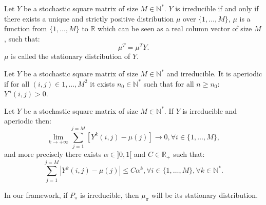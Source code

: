 \documentclass{llncs}
\newcommand{\0}{\mathbf{0}}
\newcommand{\1}{\mathbf{1}}
\begin{document}
\begin{theorem}
 Let $Y$  be a stochastic square matrix of size $M\in\mathbb{N}^*$. $Y$ is irreducible if and only if there exists a unique and strictly positive distribution $\mu$ over $\{1,\dots,M\}$, $\mu$ is a function from $\{1,\dots,M\}$ to $\mathbb{R}$ which can be seen as a real column vector of size $M$, such that:
\begin{equation}
\label{equation: stationarity}
\mu^T=\mu^TY.
\end{equation}
$\mu$ is called the stationary distribution of $Y$.
\end{theorem}
\begin{definition}
Let $Y$ be a stochastic square matrix of size $M\in\mathbb{N}^*$ and irreducible. It is aperiodic if for all $(i,j)\in {1,\dots,M}^2$ it exists $n_0\in \mathbb{N}^*$ such that for all $n\geq n_0$: $Y^n(i,j)>0$.
\end{definition}
\begin{theorem}
\label{theoreme : mixing exponential}
Let $Y$ be a stochastic square matrix of size $M\in\mathbb{N}^*$. If $Y$ is irreducible and aperiodic then:
\begin{equation}
\lim_{k\rightarrow +\infty}\sum_{j=1}^{j=M}[Y^k(i,j)-\mu(j)]\rightarrow 0,\forall i\in\{1,\dots,M\},
\end{equation}
and more precisely there exists $\alpha\in]0,1[$ and $C\in\mathbb{R}_+$ such that:
\begin{equation}
\sum_{j=1}^{j=M}|Y^k(i,j)-\mu(j)|\leq C\alpha^k,\forall i\in\{1,\dots,M\},\forall k\in\mathbb{N}^*.
\end{equation}
\end{theorem}
In our framework, if $P_\pi$ is irreducible, then $\mu_\pi$ will be its stationary distribution.
\end{document}
